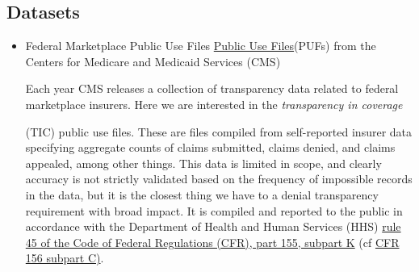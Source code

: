 \documentclass[12pt, a4paper,twoside,parskip=full]{report}
\theoremstyle{plain} %
\theoremstyle{definition} %
\theoremstyle{remark} %
\numberwithin{equation}{chapter}
\begin{document}
		\subsection{Datasets}\label{publicdata:datasets}
		
		\begin{itemize}
			\item Federal Marketplace Public Use Files \href{https://www.cms.gov/cciio/resources/data-resources/marketplace-puf}{Public Use Files}(PUFs) from the Centers for Medicare and Medicaid Services (CMS)\\
			
			\begin{tcolorbox}
			Each year CMS releases a collection of transparency data related to federal marketplace insurers. Here we are interested in the \emph{transparency in coverage}  
			(TIC) public use files. These are files compiled from self-reported insurer data specifying aggregate counts of claims submitted, claims denied, and claims appealed, among other things. This data is limited in scope, and clearly accuracy is not strictly validated based on the frequency of impossible records in the data, but it is the closest thing we have to a denial transparency requirement with broad impact. It is compiled and reported to the public in accordance with the Department of Health and Human Services (HHS) \href{https://www.ecfr.gov/current/title-45/subtitle-A/subchapter-B/part-155/subpart-K/section-155.1040}{rule 45 of the Code of Federal Regulations (CFR), part 155, subpart K} (cf \href{https://www.ecfr.gov/current/title-45/subtitle-A/subchapter-B/part-156/subpart-C/section-156.220}{CFR 156 subpart C)}.
			

\end{tcolorbox}
\end{itemize}
\end{document}
